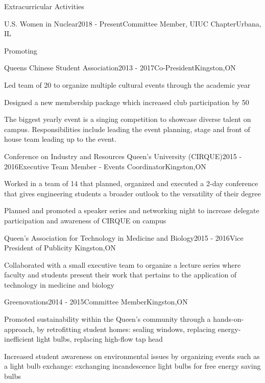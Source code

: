 \documentclass{resume2} %
\begin{document}

\begin{rSection}{Extracurricular Activities}

	\begin{rSubsection}{U.S. Women in Nuclear}{2018 - Present}{Committee Member, UIUC Chapter}{Urbana, IL}
		\item Promoting 
	\end{rSubsection}
	
	\begin{rSubsection}{Queens Chinese Student Association}{2013 - 2017}{Co-President}{Kingston,ON}
		\item Led team of 20 to organize multiple cultural events through the academic year
		\item Designed a new membership package which increased club participation by 50%
		\item The biggest yearly event is a singing competition to showcase diverse talent on campus. Responsibilities include leading the event planning, stage and front of house team leading up to the event. 
	\end{rSubsection}

	\begin{rSubsection}{Conference on Industry and Resources Queen's University (CIRQUE)}{2015 - 2016}{Executive Team Member - Events Coordinator}{Kingston,ON}
		\item Worked in a team of 14 that planned, organized and executed a 2-day conference that gives engineering students a broader outlook to the versatility of their degree
		\item Planned and promoted a speaker series and networking night to increase delegate participation and awareness of CIRQUE on campus
	\end{rSubsection}	

	\begin{rSubsection}{Queen's Association for Technology in Medicine and Biology}{2015 - 2016}{Vice President of Publicity }{Kingston,ON}
		\item Collaborated with a small executive team to organize a lecture series where faculty and students present their work that pertains to the application of technology in medicine and biology
	\end{rSubsection}	

	\begin{rSubsection}{Greenovations}{2014 - 2015}{Committee Member}{Kingston,ON}
		\item Promoted sustainability within the Queen's community through a hands-on-approach, by retrofitting student homes: sealing windows, replacing energy-inefficient light bulbs, replacing high-flow tap head
		\item Increased student awareness on environmental issues by organizing events such as a light bulb exchange: exchanging incandescence light bulbs for free energy saving bulbs
	\end{rSubsection}	
	
\end{rSection}
\end{document}
